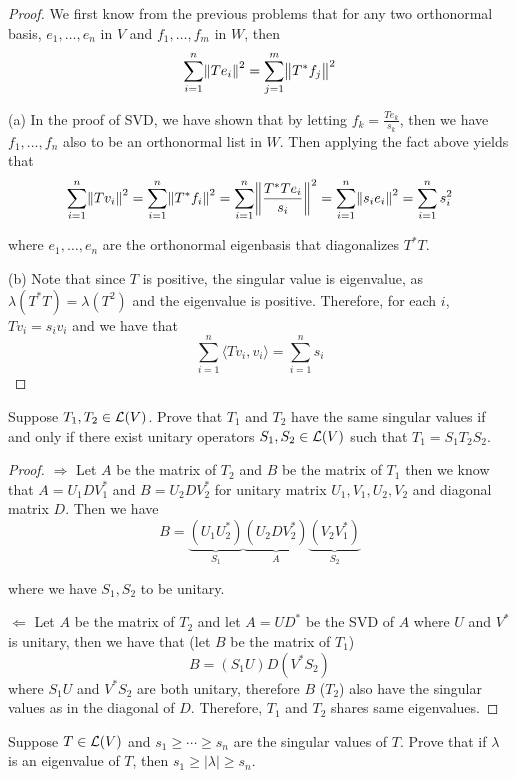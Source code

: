 \documentclass{extarticle}
\begin{document}
\begin{proof}
We first know from the previous problems that for any two orthonormal basis, \(e_1, \ldots, e_n\)
in \(V\) and \(f_1, \ldots, f_m\) in \(W\), then 
\[\sum_{i=1}^{n} \norm{Te_i}^2 = \sum_{j=1}^{m} \norm{T^* f_j}^2\]

(a) In the proof of SVD, we have shown that by letting \(f_k = \frac{Te_k}{s_k}\), then we have 
\(f_1, \ldots, f_n\) also to be an orthonormal list in \(W\). Then applying the fact above yields 
that 
\[\sum_{i=1}^{n} \norm{T v_i}^2 = \sum_{i=1}^{n} \norm{T^*f_i}^2 = 
\sum_{i=1}^{n} \norm{ \frac{T^*T e_i}{s_i}}^2 = \sum_{i=1}^{n} \norm{s_i e_i}^2 = \sum_{i=1}^{n} s_i^2\]

where \(e_1, \ldots, e_n\) are the orthonormal eigenbasis that diagonalizes \(T^*T\). 

(b) Note that since \(T\) is positive, the singular value is eigenvalue, as \(\lambda(T^*T) 
= \lambda(T^2)\) and the eigenvalue is positive. Therefore, for each \(i\), \(T v_i = s_i v_i\)
and we have that 
\[\sum_{i=1}^{n} \langle Tv_i,v_i \rangle = \sum_{i=1}^{n} s_i\]
\end{proof}

\begin{problem}{13}
    Suppose \(T_1, T_2 \in \mathcal{L}(V)\). Prove that \(T_1\) and \(T_2\) have the same singular values 
    if and only if there exist unitary operators \(S_1, S_2 \in \mathcal{L}(V)\) such that \(T_1 
    = S_1 T_2 S_2\).
\end{problem}

\begin{proof}
\(\Rightarrow\) Let \(A\) be the matrix of \(T_2\) and \(B\) be the matrix of \(T_1\) then we know that 
\(A = U_1 D V_1^*\) and \(B = U_2 D V_2^*\) for unitary matrix \(U_1, V_1, U_2, V_2\) and 
diagonal matrix \(D\). Then we have 
\[B = \underbrace{(U_1 U_2^*)}_{S_1} \underbrace{(U_2 D V_2^*)}_A \underbrace{(V_2 V_1^*)}_{S_2} \]

where we have \(S_1, S_2\) to be unitary. 

\(\Leftarrow\) Let \(A\) be the matrix of \(T_2\) and let \(A = UD^*\) be the SVD of \(A\) where 
\(U\) and \(V^*\) is unitary, then we have that (let \(B\) be the matrix of \(T_1\))
\[B = (S_1 U)D(V^*S_2)\]
where \(S_1 U\) and \(V^*S_2\) are both unitary, therefore \(B\) (\(T_2\)) also have the singular values 
as in the diagonal of \(D\). Therefore, \(T_1\) and \(T_2\) shares same eigenvalues.  
\end{proof}

\begin{problem}{15}
    Suppose \(T \in \mathcal{L}(V)\) and \(s_1 \geq \cdots \geq s_n\) are the singular values of \(T\). 
    Prove that if \(\lambda\) is an eigenvalue of \(T\), then \(s_1 \geq |\lambda| \geq s_n\).
\end{problem}
\end{document}
